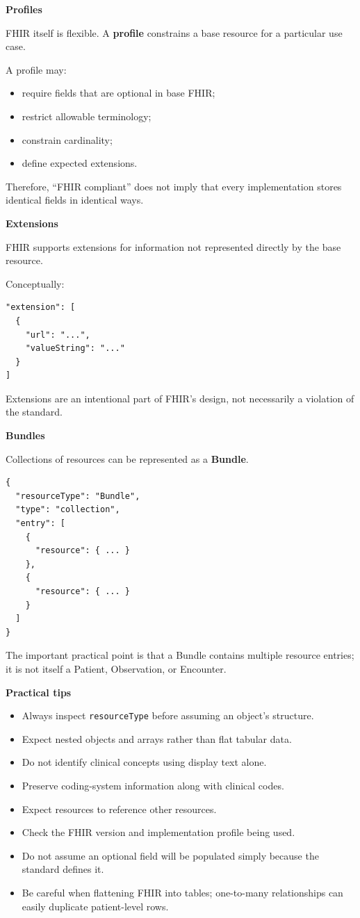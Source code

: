 \documentclass[11pt,letterpaper]{article}
\begin{document}
\textbf{Profiles}

FHIR itself is flexible. A \textbf{profile} constrains a base resource for a
particular use case.

A profile may:

\begin{itemize}[leftmargin=*]
    \item require fields that are optional in base FHIR;
    \item restrict allowable terminology;
    \item constrain cardinality;
    \item define expected extensions.
\end{itemize}

Therefore, ``FHIR compliant'' does not imply that every implementation stores
identical fields in identical ways.

\textbf{Extensions}

FHIR supports extensions for information not represented directly by the base
resource.

Conceptually:

\begin{lstlisting}
"extension": [
  {
    "url": "...",
    "valueString": "..."
  }
]
\end{lstlisting}

Extensions are an intentional part of FHIR's design, not necessarily a
violation of the standard.

\textbf{Bundles}

Collections of resources can be represented as a \textbf{Bundle}.

\begin{lstlisting}
{
  "resourceType": "Bundle",
  "type": "collection",
  "entry": [
    {
      "resource": { ... }
    },
    {
      "resource": { ... }
    }
  ]
}
\end{lstlisting}

The important practical point is that a Bundle contains multiple resource
entries; it is not itself a Patient, Observation, or Encounter.

\textbf{Practical tips}

\begin{itemize}[leftmargin=*]
    \item Always inspect \texttt{resourceType} before assuming an object's structure.
    \item Expect nested objects and arrays rather than flat tabular data.
    \item Do not identify clinical concepts using display text alone.
    \item Preserve coding-system information along with clinical codes.
    \item Expect resources to reference other resources.
    \item Check the FHIR version and implementation profile being used.
    \item Do not assume an optional field will be populated simply because the
    standard defines it.
    \item Be careful when flattening FHIR into tables; one-to-many relationships can
    easily duplicate patient-level rows.
\end{itemize}
\end{document}
